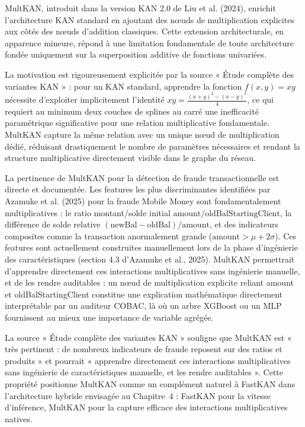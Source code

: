 \documentclass[11pt,a4paper,oneside]{report}
\theoremstyle{definition}
\theoremstyle{remark}
\begin{document}
MultKAN, introduit dans la version KAN 2.0 de Liu et al. (2024), enrichit l'architecture KAN standard en ajoutant des nœuds de multiplication explicites aux côtés des nœuds d'addition classiques. Cette extension architecturale, en apparence mineure, répond à une limitation fondamentale de toute architecture fondée uniquement sur la superposition additive de fonctions univariées.

La motivation est rigoureusement explicitée par la source « Étude complète des variantes KAN » : pour un KAN standard, apprendre la fonction $f(x, y) = xy$ nécessite d'exploiter implicitement l'identité $xy = \frac{(x+y)^2 - (x-y)^2}{4}$, ce qui requiert au minimum deux couches de splines au carré  une inefficacité paramétrique significative pour une relation multiplicative fondamentale. MultKAN capture la même relation avec un unique nœud de multiplication dédié, réduisant drastiquement le nombre de paramètres nécessaires et rendant la structure multiplicative directement visible dans le graphe du réseau.

La pertinence de MultKAN pour la détection de fraude transactionnelle est directe et documentée. Les features les plus discriminantes identifiées par Azamuke et al. (2025) pour la fraude Mobile Money sont fondamentalement multiplicatives : le ratio montant/solde initial $\text{amount} / \text{oldBalStartingClient}$, la différence de solde relative $(\text{newBal} - \text{oldBal}) / \text{amount}$, et des indicateurs composites comme la transaction anormalement grande ($\text{amount} > \mu + 2\sigma$). Ces features sont actuellement construites manuellement lors de la phase d'ingénierie des caractéristiques (section 4.3 d'Azamuke et al., 2025). MultKAN permettrait d'apprendre directement ces interactions multiplicatives sans ingénierie manuelle, et de les rendre auditables : un nœud de multiplication explicite reliant amount et oldBalStartingClient constitue une explication mathématique directement interprétable par un auditeur COBAC, là où un arbre XGBoost ou un MLP fournissent au mieux une importance de variable agrégée.

La source « Étude complète des variantes KAN » souligne que MultKAN est « très pertinent : de nombreux indicateurs de fraude reposent sur des ratios et produits » et pourrait « apprendre directement ces interactions multiplicatives sans ingénierie de caractéristiques manuelle, et les rendre auditables ». Cette propriété positionne MultKAN comme un complément naturel à FastKAN dans l'architecture hybride envisagée au Chapitre~4 : FastKAN pour la vitesse d'inférence, MultKAN pour la capture efficace des interactions multiplicatives natives.
\end{document}

